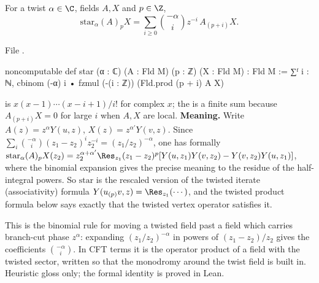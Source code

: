 \begin{definition}\label{ch08:def:star}
For a twist $\alpha\in\C$, fields $A,X$ and $p\in\Z$,
\begin{equation*}
  \mathrm{star}_\alpha(A)_pX=\sum_{i\ge0}\binom{-\alpha}{i}z^{-i}\,A_{(p+i)}X .
\end{equation*}
\end{definition}
\noindent File .
\begin{leancode}
noncomputable def star (α : ℂ) (A : Fld M) (p : ℤ) (X : Fld M) : Fld M :=
  ∑ᶠ i : ℕ, cbinom (-α) i • fzmul (-(i : ℤ)) (Fld.prod (p + i) A X)
\end{leancode}
\begin{dictionary}
 is $x(x-1)\cdots(x-i+1)/i!$ for complex $x$; the  is a finite sum
because $A_{(p+i)}X=0$ for large $i$ when $A,X$ are local.  \textbf{Meaning.}  Write
$A(z)=z^{\alpha}Y(u,z)$, $X(z)=z^{\alpha'}Y(v,z)$.  Since
$\sum_i\binom{-\alpha}{i}(z_1-z_2)^iz_2^{-i}=(z_1/z_2)^{-\alpha}$, one has formally
$\mathrm{star}_\alpha(A)_pX(z_2)=z_2^{\alpha+\alpha'}\Res_{z_1}(z_1-z_2)^p[Y(u,z_1)Y(v,z_2)-Y(v,z_2)Y(u,z_1)]$,
where the binomial expansion gives the precise meaning to the residue of the half-integral
powers.  So $\mathrm{star}$ is the rescaled version of the twisted iterate (associativity)
formula $Y(u_{(p)}v,z)=\Res_{z_1}(\cdots)$, and the twisted product formula below says exactly
that the twisted vertex operator satisfies it.
\end{dictionary}

\begin{physics}
This is the binomial rule for moving a twisted field past a field which carries branch-cut phase $z^{\alpha}$: expanding $(z_1/z_2)^{-\alpha}$ in powers of $(z_1-z_2)/z_2$ gives the coefficients $\binom{-\alpha}{i}$. In CFT terms it is the operator product of a field with the twisted sector, written so that the monodromy around the twist field is built in. Heuristic gloss only; the formal identity is proved in Lean.
\end{physics}

